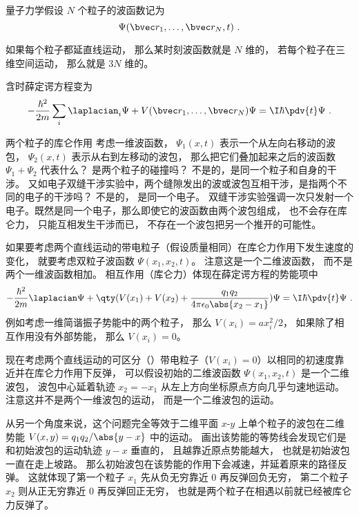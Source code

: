 
\begin{issues}
\issueDraft
\end{issues}


量子力学假设 $N$ 个粒子的波函数记为
\begin{equation}
\Psi(\bvec r_1, \dots, \bvec r_N, t)~.
\end{equation}


如果每个粒子都延直线运动， 那么某时刻波函数就是 $N$ 维的， 若每个粒子在三维空间运动， 那么就是 $3N$ 维的。

含时薛定谔方程变为
\begin{equation}
-\frac{\hbar^2}{2m} \sum_i\laplacian_i \Psi + V(\bvec r_1, \dots, \bvec r_N) \Psi = \I \hbar \pdv{t}\Psi~.
\end{equation}


\begin{example}{两个粒子的库仑作用}
考虑一维波函数， $\Psi_1(x,t)$ 表示一个从左向右移动的波包， $\Psi_2(x,t)$ 表示从右到左移动的波包， 那么把它们叠加起来之后的波函数 $\Psi_1 + \Psi_2$ 代表什么？ 是两个粒子的碰撞吗？ 不是的，是同一个粒子和自身的干涉。 又如电子双缝干涉实验中，两个缝隙发出的波或波包互相干涉，是指两个不同的电子的干涉吗？ 不是的， 是同一个电子。 双缝干涉实验强调一次只发射一个电子。既然是同一个电子，那么即使它的波函数由两个波包组成， 也不会存在库仑力， 只能互相发生干涉而已， 不存在一个波包把另一个推开的可能性。

如果要考虑两个直线运动的带电粒子（假设质量相同）在库仑力作用下发生速度的变化， 就要考虑双粒子波函数 $\Psi(x_1, x_2, t)$。 注意这是一个二维波函数， 而不是两个一维波函数相加。 相互作用（库仑力）体现在薛定谔方程的势能项中
\begin{equation}
-\frac{\hbar^2}{2m}\laplacian \Psi + \qty(V(x_1) + V(x_2) + \frac{q_1 q_2}{4\pi\epsilon_0\abs{x_2 - x_1}}) \Psi = \I\hbar \pdv{t}\Psi~.
\end{equation}
例如考虑一维简谐振子势能中的两个粒子， 那么 $V(x_i) = ax_i^2/2$， 如果除了相互作用没有外部势能， 那么 $V(x_i) = 0$。

现在考虑两个直线运动的可区分（）带电粒子（$V(x_i) = 0$）以相同的初速度靠近并在库仑力作用下反弹， 可以假设初始的二维波函数 $\Psi(x_1, x_2, t)$ 是一个二维波包， 波包中心延着轨迹 $x_2 = -x_1$ 从左上方向坐标原点方向几乎匀速地运动。 注意这并不是两个一维波包的运动， 而是一个二维波包的运动。

从另一个角度来说，这个问题完全等效于二维平面 $x$-$y$ 上单个粒子的波包在二维势能 $V(x,y) = q_1q_2/\abs{y-x}$ 中的运动。 画出该势能的等势线会发现它们是和初始波包的运动轨迹 $y-x$ 垂直的， 且越靠近原点势能越大， 也就是初始波包一直在走上坡路。 那么初始波包在该势能的作用下会减速，并延着原来的路径反弹。 这就体现了第一个粒子 $x_1$ 先从负无穷靠近 $0$ 再反弹回负无穷， 第二个粒子 $x_2$ 则从正无穷靠近 $0$ 再反弹回正无穷， 也就是两个粒子在相遇以前就已经被库仑力反弹了。
\end{example}
